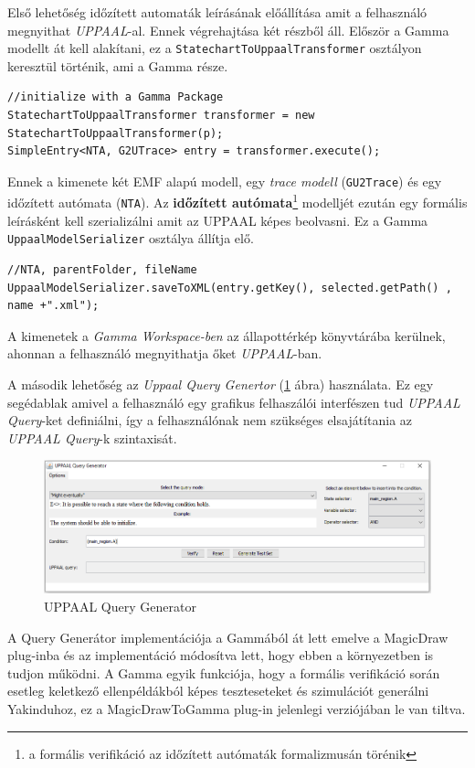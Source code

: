 Első lehetőség időzített automaták leírásának előállítása amit a felhasználó megnyithat \emph{UPPAAL}-al. Ennek végrehajtása két részből áll. Először a Gamma modellt át kell alakítani, ez a \verb+StatechartToUppaalTransformer+ osztályon keresztül történik, ami a Gamma része.
\begin{lstlisting}
//initialize with a Gamma Package
StatechartToUppaalTransformer transformer = new StatechartToUppaalTransformer(p);
SimpleEntry<NTA, G2UTrace> entry = transformer.execute();
\end{lstlisting}
Ennek a kimenete két EMF alapú modell, egy \emph{trace modell} (\verb+GU2Trace+) és egy időzített autómata (\verb+NTA+). Az \textbf{időzített autómata}\footnote{a formális verifikáció az időzített autómaták formalizmusán törénik} modelljét ezután egy formális leírásként kell szerializálni amit az UPPAAL képes beolvasni. Ez a Gamma \verb+UppaalModelSerializer+ osztálya állítja elő. 
\begin{lstlisting}
//NTA, parentFolder, fileName
UppaalModelSerializer.saveToXML(entry.getKey(), selected.getPath() , name +".xml");
\end{lstlisting}
A kimenetek a \emph{Gamma Workspace-ben} az állapottérkép könyvtárába kerülnek, ahonnan a felhasználó megnyithatja őket \emph{UPPAAL}-ban.

A második lehetőség az \emph{Uppaal Query Genertor} (\ref{fig:upp-query-gen} ábra) használata. Ez egy segédablak amivel a felhasználó egy grafikus felhaszálói interfészen tud \emph{UPPAAL Query}-ket definiálni, így a felhasználónak nem szükséges elsajátítania az \emph{UPPAAL Query}-k szintaxisát.

\begin{figure}[!ht]
	\centering
	\includegraphics[keepaspectratio, width=150mm]{figures/query-gen.png}
	\caption{UPPAAL Query Generator}
	\label{fig:upp-query-gen}
\end{figure}

A Query Generátor implementációja a Gammából át lett emelve a MagicDraw plug-inba és az implementáció módosítva lett, hogy ebben a környezetben is tudjon működni. A Gamma egyik funkciója, hogy a formális verifikáció során esetleg keletkező ellenpéldákból képes teszteseteket és szimulációt generálni Yakinduhoz, ez a MagicDrawToGamma plug-in jelenlegi verziójában le van tiltva.

